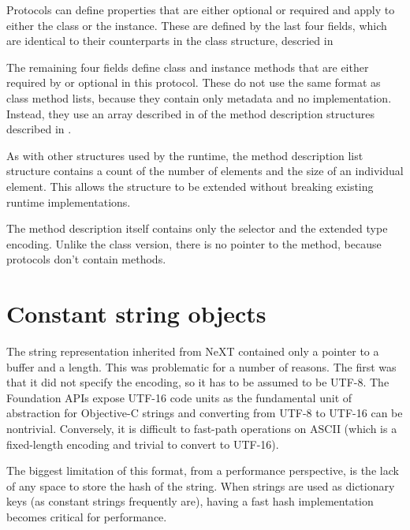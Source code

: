 \documentclass[a4paper]{report}
\newcommand{\inccode}[4]{
{
	 }}
	]{../#1}
}
}
\begin{document}
Protocols can define properties that are either optional or required and apply to either the class or the instance.
These are defined by the last four fields, which are identical to their counterparts in the class structure, descried in 

\inccode{protocol.h}{protocol}{objc_protocol}{The protocol structure.}

The remaining four fields define class and instance methods that are either required by or optional in this protocol.
These do not use the same format as class method lists, because they contain only metadata and no implementation.
Instead, they use an array described in  of the method description structures described in .

As with other structures used by the runtime, the method description list structure contains a count of the number of elements and the size of an individual element.
This allows the structure to be extended without breaking existing runtime implementations.

\inccode{protocol.h}{protocolmethodlist}{objc_protocol_method_description_list}{The protocol method list structure.}

The method description itself contains only the selector and the extended type encoding.
Unlike the class version, there is no pointer to the method, because protocols don't contain methods.

\inccode{protocol.h}{protocolmethod}{objc_protocol_method_description}{The protocol method description structure.}
\chapter{Constant string objects}
\label{chap:constantstrings}

The string representation inherited from NeXT contained only a pointer to a buffer and a length.
This was problematic for a number of reasons.
The first was that it did not specify the encoding, so it has to be assumed to be UTF-8.
The Foundation APIs expose UTF-16 code units as the fundamental unit of abstraction for Objective-C strings and converting from UTF-8 to UTF-16 can be nontrivial.
Conversely, it is difficult to fast-path operations on ASCII (which is a fixed-length encoding and trivial to convert to UTF-16).

The biggest limitation of this format, from a performance perspective, is the lack of any space to store the hash of the string.
When strings are used as dictionary keys (as constant strings frequently are), having a fast hash implementation becomes critical for performance.
\end{document}
